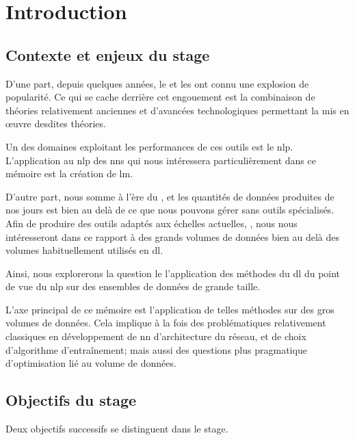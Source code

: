 \chapter{Introduction}

\section[Contexte \& Enjeux]{Contexte et enjeux du stage}

D'une part, depuis quelques années, le \og{}\fg{} et les \og{}\fg{} ont connu une explosion de popularité.
Ce qui se cache derrière cet engouement est la combinaison de théories relativement anciennes et d'avancées technologiques permettant la mis en œuvre desdites théories.

Un des domaines exploitant les performances de ces outils est le \gls{nlp}.
L'application au \gls{nlp} des \glspl{nn} qui nous intéressera particulièrement dans ce mémoire est la création de \gls{lm}.

D'autre part, nous somme à l'ère du \og{}\fg{}, et les quantités de données produites de nos jours est bien au delà de ce que nous pouvons gérer sans outils spécialisés.
Afin de produire des outils adaptés aux échelles actuelles, , nous nous intéresseront dans ce rapport à des grands volumes de données bien au delà des volumes habituellement utilisés en \gls{dl}.

Ainsi, nous explorerons la question le l'application des méthodes du \gls{dl} du point de vue du \gls{nlp} sur des ensembles de données de grande taille.

L'axe principal de ce mémoire est l'application de telles méthodes sur des gros volumes de données.
Cela implique à la fois des problématiques relativement classiques en développement de \gls{nn} d'architecture du réseau, et de choix d'algorithme d'entraînement; mais aussi des questions plus pragmatique d'optimisation lié au volume de données.%


\section[Objectifs]{Objectifs du stage}
Deux objectifs successifs se distinguent dans le stage.


